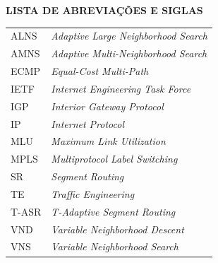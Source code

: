 \clearpage
\clearpage
\begin{center}
\textbf{LISTA DE ABREVIAÇÕES E SIGLAS}
\end{center}

\vspace*{1.cm}

\doublespacing  \begin{tabular}{l l}
ALNS&    \textit{Adaptive Large Neighborhood Search}\\
AMNS&    \textit{Adaptive Multi-Neighborhood Search}\\
ECMP&    \textit{Equal-Cost Multi-Path}\\
IETF&    \textit{Internet Engineering Task Force}\\
IGP&     \textit{Interior Gateway Protocol}\\
IP&      \textit{Internet Protocol}\\
MLU&     \textit{Maximum Link Utilization}\\
MPLS&    \textit{Multiprotocol Label Switching}\\
SR&      \textit{Segment Routing}\\
TE&      \textit{Traffic Engineering}\\
T-ASR&   \textit{T-Adaptive Segment Routing}\\
VND&     \textit{Variable Neighborhood Descent}\\
VNS&     \textit{Variable Neighborhood Search}\\
\end{tabular}  \thispagestyle{empty}
